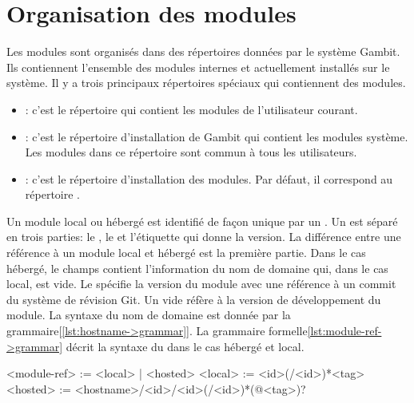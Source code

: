 \section{Organisation des modules}

Les modules sont organisés dans des répertoires données par le système Gambit.
Ils contiennent l'ensemble des modules internes et actuellement installés sur
le système. Il y a trois principaux répertoires spéciaux qui contiennent des
modules.

\begin{itemize}
  \item {}: c'est le répertoire qui contient les modules
    de l'utilisateur courant.

  \item {}: c'est le répertoire d'installation de Gambit
    qui contient les modules système. Les modules dans ce répertoire sont
    commun à tous les utilisateurs.

  \item {}: c'est le répertoire d'installation des modules.
    Par défaut, il correspond au répertoire .
\end{itemize}

Un module local ou hébergé est identifié de façon unique par un
.  Un  est séparé en trois parties: le
, le  et l'étiquette qui donne la version.  La
différence entre une référence à un module local et hébergé est la première
partie. Dans le cas hébergé, le champs  contient
l'information du nom de domaine qui, dans le cas local, est vide.
Le  spécifie la version du module avec une référence à
un commit du système de révision Git. Un  vide réfère
à la version de développement du module.  La syntaxe du
nom de domaine est donnée par la grammaire[\ref{lst:hostname->grammar}].  La
grammaire formelle\ref{lst:module-ref->grammar} décrit la syntaxe du
 dans le cas hébergé et local.\\

\begin{center}
  \begin{mplisting}{0.8}
<module-ref> := <local> | <hosted>
<local>      := <id>(/<id>)*<tag>
<hosted>     := <hostname>/<id>/<id>(/<id>)*(@<tag>)?
\end{mplisting}
  \label{lst:module-ref->grammar}
\end{center}

